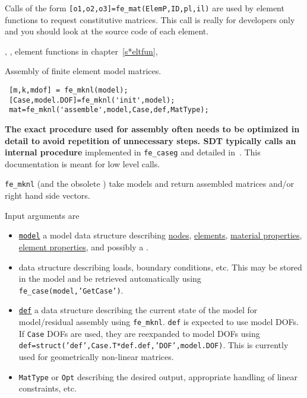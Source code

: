 
Calls of the form {\tt [o1,o2,o3]=fe\_mat(ElemP,ID,pl,il)} are used by element functions to request constitutive matrices. This call is really for developers only and you should look at the source code of each element.



\noindent \melastic, \pshell, element functions in chapter~\ref{s*eltfun}, 


\noindent Assembly of finite element model matrices.

\rsyntax\begin{verbatim}
 [m,k,mdof] = fe_mknl(model);
 [Case,model.DOF]=fe_mknl('init',model); 
 mat=fe_mknl('assemble',model,Case,def,MatType);
\end{verbatim}


\begin{SDT}
 {\bf The exact procedure used for assembly often needs to be optimized in detail to avoid repetition of unnecessary steps. SDT typically calls an internal procedure} implemented in {\tt fe\_caseg}  and detailed in~. This documentation is meant for low level calls.
\end{SDT}


{\tt fe\_mknl} (and the obsolete \femk) take models and return assembled matrices and/or right hand side vectors. 

Input arguments are

\begin{itemize}

\item \hyperlink{model}{{\tt model}} a model data structure describing \hyperlink{node}{nodes}, \hyperlink{elt}{elements}, \hyperlink{pl}{material properties}, \hyperlink{il}{element properties}, and possibly a .

\item {} data structure describing loads, boundary conditions, etc. This may be stored in the model and be retrieved automatically using {\tt fe\_case(model,'GetCase')}. 

\item \hyperlink{def}{{\tt def}} a data structure describing the current state of the model for model/residual assembly using {\tt fe\_mknl}. {\tt def} is expected to use model DOFs. If {\tt Case} DOFs are used, they are reexpanded to model DOFs using {\tt def=struct('def',Case.T*def.def,'DOF',model.DOF)}. This is currently used for geometrically non-linear matrices.

\item {\tt MatType} or {\tt Opt} describing the desired output, appropriate handling of linear constraints, etc. 

\end{itemize}

